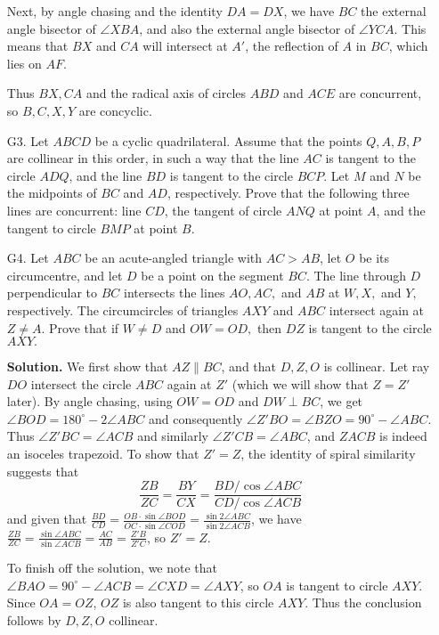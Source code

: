 \documentclass[11pt,a4paper]{article}
\begin{document}
\begin{enumerate}
    	Next, by angle chasing and the identity $DA=DX$, 
    	we have $BC$ the external angle bisector of $\angle XBA$, 
    	and also the external angle bisector of $\angle YCA$. 
    	This means that $BX$ and $CA$ will intersect at $A'$, the reflection of $A$ in $BC$, 
    	which lies on $AF$. 
    	
    	Thus $BX, CA$ and the radical axis of circles $ABD$ and $ACE$ are concurrent, 
    	so $B, C, X, Y$ are concyclic. 
    	
    	\item [G3.]
    	Let $ABCD$ be a cyclic quadrilateral. 
    	Assume that the points $Q, A, B, P$ are collinear in this order, 
    	in such a way that the line $AC$ is tangent to the circle $ADQ$, and the line $BD$ is tangent to the circle $BCP$. 
    	Let $M$ and $N$ be the midpoints of $BC$ and $AD$, respectively. 
    	Prove that the following three lines are concurrent: line $CD$, 
    	the tangent of circle $ANQ$ at point $A$, and the tangent to circle $BMP$ at point $B$.
    	
    	
    	\item [G4.]
    	Let $ABC$ be an acute-angled triangle with $AC > AB$, let $O$ be its circumcentre, and let $D$ be a point on the segment $BC$. The line through $D$ perpendicular to $BC$ intersects the lines $AO, AC,$ and $AB$ at $W, X,$ and $Y,$ respectively. The circumcircles of triangles $AXY$ and $ABC$ intersect again at $Z \ne A$.
    	Prove that if $W \ne D$ and $OW = OD,$ then $DZ$ is tangent to the circle $AXY.$
    	
    	\textbf{Solution.} We first show that $AZ\parallel BC$, and that $D, Z, O$ is collinear. 
    	Let ray $DO$ intersect the circle $ABC$ again at $Z'$ (which we will show that $Z=Z'$ later). 
    	By angle chasing, using $OW=OD$ and $DW\perp BC$, 
    	we get $\angle BOD = 180^{\circ} - 2\angle ABC$ and consequently $\angle Z'BO=\angle BZO=90^{\circ}-\angle ABC$. 
    	Thus $\angle Z'BC = \angle ACB$ and similarly $\angle Z'CB = \angle ABC$, 
    	and $ZACB$ is indeed an isoceles trapezoid. 
    	To show that $Z'=Z$, the identity of spiral similarity suggests that 
    	\[
    	\frac{ZB}{ZC} = \frac{BY}{CX} = \frac{BD/\cos\angle ABC}{CD/\cos\angle ACB}
    	\]
    	and given that $\frac{BD}{CD} = \frac{OB\cdot\sin\angle BOD}{OC\cdot\sin\angle COD}
    	=\frac{\sin 2\angle ABC}{\sin 2\angle ACB}$, we have $\frac{ZB}{ZC}  = \frac{\sin\angle ABC}{\sin\angle ACB} = \frac{AC}{AB} = \frac{Z'B}{Z'C}$, so $Z'=Z$.  
    	
    	To finish off the solution, we note that $\angle BAO = 90^{\circ} - \angle ACB = \angle CXD = \angle AXY$, 
    	so $OA$ is tangent to circle $AXY$. Since $OA=OZ$, $OZ$ is also tangent to this circle $AXY$. 
    	Thus the conclusion follows by $D, Z, O$ collinear. 
    	

\end{enumerate}
\end{document}
